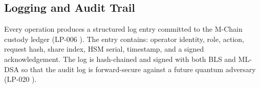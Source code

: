 \subsection{Logging and Audit Trail}

Every operation produces a structured log entry committed to the
M-Chain custody ledger (LP-006 \cite{lp006}). The entry contains:
operator identity, role, action, request hash, share index, HSM
serial, timestamp, and a signed acknowledgement. The log is hash-chained
and signed with both BLS and ML-DSA so that the audit log is forward-secure
against a future quantum adversary (LP-020 \cite{lp020}).


